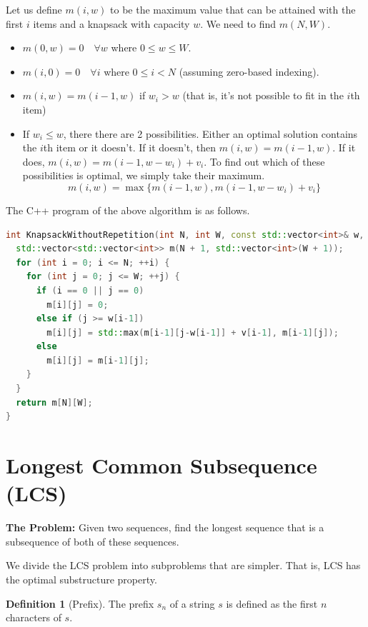 \documentclass[12pt, a4paper]{article}
\theoremstyle{definition}
\newtheorem{definition}{Definition}[section]
\theoremstyle{remark}
\begin{document}
Let us define $m(i, w)$ to be the maximum value that can be attained with the first $i$ items and a knapsack with capacity $w$. We need to find $m(N, W)$.
\begin{itemize}
    \item $m(0, w) = 0 \quad \forall w$ where $0 \leq w \leq W$.
    \item $m(i, 0) = 0 \quad \forall i$ where $0 \leq i < N$ (assuming zero-based indexing).
    \item $m(i, w) = m(i - 1, w)$ \quad if $w_i > w$ (that is, it's not possible to fit in the $i$th item)
    \item If $w_i \leq w$, there there are 2 possibilities. Either an optimal solution contains the $i$th item or it doesn't. If it doesn't, then $m(i, w) = m(i-1, w)$. If it does, $m(i, w) = m(i - 1, w - w_i) + v_i$. To find out which of these possibilities is optimal, we simply take their maximum.
          $$
              m(i, w) = \max \{ m(i-1, w), m(i-1, w-w_i) + v_i \}
          $$
\end{itemize}

The C++ program of the above algorithm is as follows.

\begin{lstlisting}[language=C++]
int KnapsackWithoutRepetition(int N, int W, const std::vector<int>& w, const std::vector<int>& v) {
  std::vector<std::vector<int>> m(N + 1, std::vector<int>(W + 1));
  for (int i = 0; i <= N; ++i) {
    for (int j = 0; j <= W; ++j) {
      if (i == 0 || j == 0)
        m[i][j] = 0;
      else if (j >= w[i-1])
        m[i][j] = std::max(m[i-1][j-w[i-1]] + v[i-1], m[i-1][j]);
      else 
        m[i][j] = m[i-1][j];
    }
  }
  return m[N][W];
}
\end{lstlisting}

\section{Longest Common Subsequence (LCS)} \label{LCS}
\begin{tcolorbox}
    \textbf{The Problem:} Given two sequences, find the longest sequence that is a subsequence of both of these sequences.
\end{tcolorbox}

We divide the LCS problem into subproblems that are simpler. That is, LCS has the optimal substructure property.

\begin{definition}[Prefix]
    The prefix $s_n$ of a string $s$ is defined as the first $n$ characters of $s$.
\end{definition}
\end{document}
